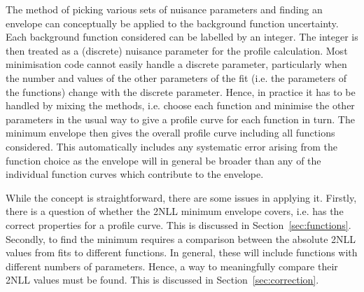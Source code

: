 The method of picking various sets of nuisance parameters and finding
an envelope can conceptually be applied to the background function
uncertainty. Each background function considered can be labelled by an
integer. The integer is then treated as a (discrete) nuisance parameter
for the profile calculation.
Most minimisation
code cannot easily handle a discrete parameter, particularly when the
number and values of the other parameters of the fit (i.e. the parameters
of the functions) change with the discrete parameter.
Hence, in practice it has
to be handled by mixing the methods, i.e. choose each function and minimise
the other parameters in the usual way to give a profile curve for each function
in turn. The minimum envelope then gives the overall profile curve including
all functions considered. This automatically includes any systematic error
arising from the function choice as the envelope will in general be broader
than any of the individual function curves which contribute to the envelope.

While the concept is straightforward, there are some issues in applying it.
Firstly, there is a question of whether the 2NLL minimum envelope covers,
i.e. has the correct properties for a profile curve.
This is discussed in Section~\ref{sec:functions}.
Secondly, to find the minimum requires a
comparison between the absolute 2NLL values from fits to different functions.
In general, these will include functions with different numbers of parameters.
Hence, a way to meaningfully compare their 2NLL values must be found.
This is discussed in Section~\ref{sec:correction}.
